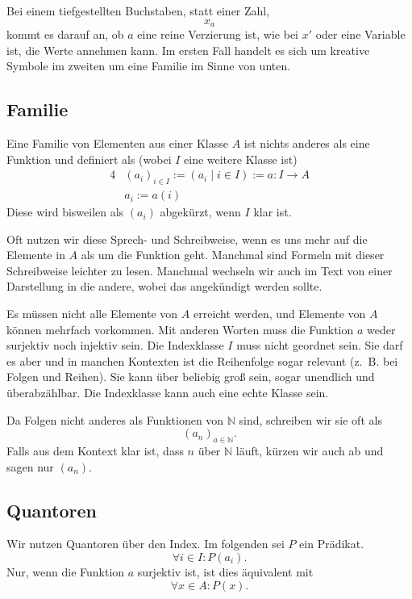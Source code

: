 \documentclass[a4paper]{amsart}
\theoremstyle{definition}
\newcommand{\N}{\ensuremath{\mathbb{ N }}}
\newcommand{\zb}{z.~B. }
\begin{document}
Bei einem tiefgestellten Buchstaben, statt einer Zahl,
\begin{equation}
    x_a
\end{equation}
kommt es darauf an, ob $a$ eine reine Verzierung ist, wie bei $x'$ oder eine Variable ist, die Werte annehmen kann. Im ersten Fall handelt es sich um kreative Symbole im zweiten um eine Familie im Sinne von unten.

\subsection{Familie}
Eine Familie von Elementen aus einer Klasse $A$ ist nichts anderes als eine Funktion und definiert als (wobei $I$ eine weitere Klasse ist)
\begin{alignat}{4}
    &(a_i)_{i \in I} := (a_i \mid i \in I) := a \colon I \to A\\
    &a_i := a(i)
\end{alignat}
Diese wird bisweilen als $(a_i)$ abgekürzt, wenn $I$ klar ist.

Oft nutzen wir diese Sprech- und Schreibweise, wenn es uns mehr auf die Elemente in $A$ als um die Funktion geht. Manchmal sind Formeln mit dieser Schreibweise leichter zu lesen. Manchmal wechseln wir auch im Text von einer Darstellung in die andere, wobei das angekündigt werden sollte.

Es müssen nicht alle Elemente von $A$ erreicht werden, und Elemente von $A$ können mehrfach vorkommen. Mit anderen Worten muss die Funktion $a$ weder surjektiv noch injektiv sein. Die Indexklasse $I$ muss nicht geordnet sein. Sie darf es aber und in manchen Kontexten ist die Reihenfolge sogar relevant (\zb bei Folgen und Reihen). Sie kann über beliebig groß sein, sogar unendlich und überabzählbar. Die Indexklasse kann auch eine echte Klasse sein.

Da Folgen nicht anderes als Funktionen von $\N$ sind, schreiben wir sie oft als
\begin{equation}
    (a_n)_{a\in \N}.
\end{equation}
Falls aus dem Kontext klar ist, dass $n$ über $\N$ läuft, kürzen wir auch ab und sagen nur $(a_n)$.

\subsection{Quantoren}
Wir nutzen Quantoren über den Index. Im folgenden sei $P$ ein Prädikat.
\begin{equation}
    \forall i \in I \colon P(a_i).
\end{equation}
Nur, wenn die Funktion $a$ surjektiv ist, ist dies äquivalent mit
\begin{equation}
    \forall x \in A \colon P(x).
\end{equation}
\end{document}

